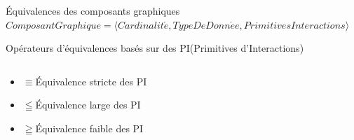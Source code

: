 \documentclass[11pt]{beamer}
\begin{document}
\begin{frame}[t]{Équivalences des composants graphiques}
{\scriptsize $Composant Graphique=\langle Cardinalit\acute e, TypeDeDonn\acute ee , PrimitivesInteractions\rangle$}

\begin{block}{{\scriptsize Opérateurs d'équivalences basés sur des PI(Primitives d'Interactions) }}
\begin{columns}
	\begin{column}{.4\textwidth}
\begin{itemize}
\item<1> $ \equiv ${\tiny Équivalence stricte des PI}
\item<2> $ \leqq ${\tiny Équivalence large des PI} 
\item<3> $\geqq ${\tiny Équivalence faible des PI} 
\end{itemize}
\end{column}
	

\end{columns}
\end{block}
\end{frame}
\end{document}
